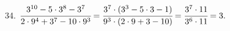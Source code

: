 34. $\cfrac{3^{10}-5\cdot3^8-3^7}{2\cdot9^4+3^7-10\cdot9^3}=\cfrac{3^7\cdot(3^3-5\cdot3-1)}{9^3\cdot(2\cdot9+3-10)}=
\cfrac{3^7\cdot11}{3^6\cdot11}=3.$\\
